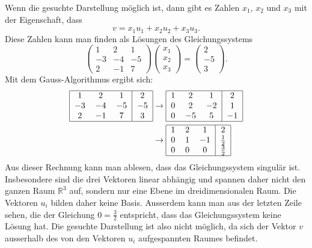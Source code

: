 \begin{loesung}
Wenn die gesuchte Darstellung möglich ist, dann gibt es Zahlen
$x_1$, $x_2$ und $x_3$ mit der Eigenschaft, dass
\[
v =x_1u_1+x_2u_2+x_3u_3.
\]
Diese Zahlen kann man finden als Lösungen des Gleichungssystems
\[
\begin{pmatrix}
1 & 2 & 1\\
-3 & -4 & -5\\
2 & -1 & 7
\end{pmatrix}
\begin{pmatrix}
x_1\\x_2\\x_3
\end{pmatrix}
=
\begin{pmatrix}
2\\-5\\3
\end{pmatrix}.
\]
Mit dem Gauss-Algorithmus ergibt sich:
\begin{align*}
\begin{tabular}{|ccc|c|}
\hline
1&2&1&2\\
$-3$&$-4$&$-5$&$-5$\\
2&$-1$&7&3\\
\hline
\end{tabular}
&\rightarrow
\begin{tabular}{|ccc|c|}
\hline
1&2&1&2\\
0&2&$-2$&1\\
0&$-5$&5&$-1$\\
\hline
\end{tabular}
\\
&\rightarrow
\begin{tabular}{|ccc|c|}
\hline
1&2&1&2\\
0&1&$-1$&$\frac12$\\
0&0&0&$\frac32$\\
\hline
\end{tabular}
\end{align*}
Aus dieser Rechnung kann man ablesen, dass das Gleichungssystem singulär
ist. Insbesondere sind die drei Vektoren linear abhängig und spannen daher
nicht den ganzen Raum $\mathbb{R}^3$ auf, sondern nur eine Ebene im dreidimensionalen 
Raum. Die Vektoren $u_i$ bilden daher keine Basis. 
Ausserdem kann man aus der letzten Zeile sehen, die der
Gleichung $0=\frac32$ entspricht, dass das Gleichungssystem
keine Lösung hat. Die gesuchte Darstellung ist also nicht möglich, da sich der Vektor $v$
ausserhalb des von den Vektoren $u_i$ aufgespannten Raumes befindet.
\end{loesung}

